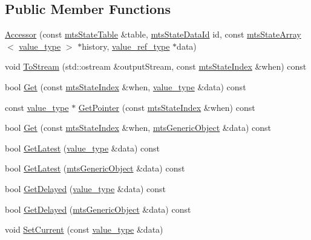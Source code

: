 \subsection*{Public Member Functions}
\begin{DoxyCompactItemize}
\item 
\hyperlink{classmts_state_table_1_1_accessor_abf8c0fc4ede80f1e147e3eb973dc7986}{Accessor} (const \hyperlink{classmts_state_table}{mts\-State\-Table} \&table, \hyperlink{mts_state_table_8h_ac3a0e34e8991d51790b043fa01857a35}{mts\-State\-Data\-Id} id, const \hyperlink{classmts_state_array}{mts\-State\-Array}$<$ \hyperlink{classmts_generic_object_proxy}{value\-\_\-type} $>$ $\ast$history, \hyperlink{classmts_generic_object_proxy_ref}{value\-\_\-ref\-\_\-type} $\ast$data)
\item 
void \hyperlink{classmts_state_table_1_1_accessor_af084d82f7dbdaefdb60ddd415d68dfe9}{To\-Stream} (std\-::ostream \&output\-Stream, const \hyperlink{classmts_state_index}{mts\-State\-Index} \&when) const 
\item 
bool \hyperlink{classmts_state_table_1_1_accessor_ae0f8e995ce012dcf00d30575315957b8}{Get} (const \hyperlink{classmts_state_index}{mts\-State\-Index} \&when, \hyperlink{classmts_generic_object_proxy}{value\-\_\-type} \&data) const 
\item 
const \hyperlink{classmts_generic_object_proxy}{value\-\_\-type} $\ast$ \hyperlink{classmts_state_table_1_1_accessor_aa603b30d82c5343d03ac3aceeed3fc8d}{Get\-Pointer} (const \hyperlink{classmts_state_index}{mts\-State\-Index} \&when) const 
\item 
bool \hyperlink{classmts_state_table_1_1_accessor_a8ed438d66407ab1e336d67d721ab7a67}{Get} (const \hyperlink{classmts_state_index}{mts\-State\-Index} \&when, \hyperlink{classmts_generic_object}{mts\-Generic\-Object} \&data) const 
\item 
bool \hyperlink{classmts_state_table_1_1_accessor_a91e735c0023b796d0ddbcb5ec10b2213}{Get\-Latest} (\hyperlink{classmts_generic_object_proxy}{value\-\_\-type} \&data) const 
\item 
bool \hyperlink{classmts_state_table_1_1_accessor_a00fc295cb64007c7012e19389dddbcf7}{Get\-Latest} (\hyperlink{classmts_generic_object}{mts\-Generic\-Object} \&data) const 
\item 
bool \hyperlink{classmts_state_table_1_1_accessor_ad6abf9b013d69b6d2d76bc3d8a291f9d}{Get\-Delayed} (\hyperlink{classmts_generic_object_proxy}{value\-\_\-type} \&data) const 
\item 
bool \hyperlink{classmts_state_table_1_1_accessor_a472b9f6daddfcf0f30fa84d25c08d910}{Get\-Delayed} (\hyperlink{classmts_generic_object}{mts\-Generic\-Object} \&data) const 
\item 
void \hyperlink{classmts_state_table_1_1_accessor_aad12d6d36beefc5e24cd469fd82f5b81}{Set\-Current} (const \hyperlink{classmts_generic_object_proxy}{value\-\_\-type} \&data)
\end{DoxyCompactItemize}
